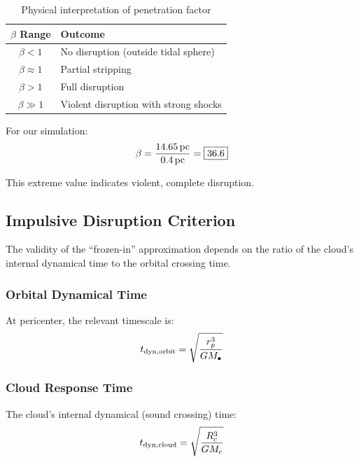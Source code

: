 \documentclass[twocolumn,amsmath,amssymb,prd,superscriptaddress,nofootinbib]{revtex4-2}
\begin{document}
\begin{table}[h]
\centering
\caption{Physical interpretation of penetration factor}
\label{tab:beta_interp}
\begin{tabular}{cl}
\toprule
$\beta$ Range & Outcome \\
\midrule
$\beta < 1$ & No disruption (outside tidal sphere) \\
$\beta \approx 1$ & Partial stripping \\
$\beta > 1$ & Full disruption \\
$\beta \gg 1$ & Violent disruption with strong shocks \\
\bottomrule
\end{tabular}
\end{table}

For our simulation:
\begin{equation}
    \beta = \frac{14.65\,{\rm pc}}{0.4\,{\rm pc}} = \boxed{36.6}
\end{equation}

This extreme value indicates violent, complete disruption.

\subsection{Impulsive Disruption Criterion}
\label{sec:impulsive}

The validity of the ``frozen-in'' approximation depends on the ratio of the cloud's internal dynamical time to the orbital crossing time.

\subsubsection{Orbital Dynamical Time}

At pericenter, the relevant timescale is:
\begin{equation}
    t_{\rm dyn,orbit} = \sqrt{\frac{r_p^3}{GM_\bullet}}
    \label{eq:t_orb}
\end{equation}

\subsubsection{Cloud Response Time}

The cloud's internal dynamical (sound crossing) time:
\begin{equation}
    t_{\rm dyn,cloud} = \sqrt{\frac{R_c^3}{GM_c}}
    \label{eq:t_cloud}
\end{equation}
\end{document}
